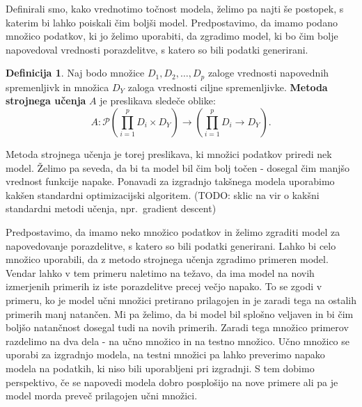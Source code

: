 \documentclass[12pt,a4paper,twoside]{article}
\theoremstyle{definition} %
\newtheorem{definicija}{Definicija}[section]
\theoremstyle{plain} %
\numberwithin{equation}{section}  %
\begin{document}
Definirali smo, kako vrednotimo točnost modela, želimo pa najti še postopek, s katerim bi lahko poiskali čim boljši model. Predpostavimo, da imamo podano množico podatkov, ki jo želimo uporabiti, da zgradimo model, ki bo čim bolje napovedoval vrednosti porazdelitve, s katero so bili podatki generirani.

\begin{definicija}
Naj bodo množice $D_1, D_2, \ldots, D_p$ zaloge vrednosti napovednih spremenljivk in množica $D_Y$ zaloga vrednosti ciljne spremenljivke. 
\textbf{Metoda strojnega učenja} $A$ je preslikava sledeče oblike:
\[
A: \mathcal{P}(\prod_{i=1}^p D_i \times D_Y) \rightarrow (\prod_{i=1}^p D_i \rightarrow D_Y).
\]
\end{definicija}

Metoda strojnega učenja je torej preslikava, ki množici podatkov priredi nek model. Želimo pa seveda, da bi ta model bil čim bolj točen - dosegal čim manjšo vrednost funkcije napake. Ponavadi za izgradnjo takšnega modela uporabimo kakšen standardni optimizacijski algoritem. (TODO: sklic na vir o kakšni standardni metodi učenja, npr.\ gradient descent)

Predpostavimo, da imamo neko množico podatkov in želimo zgraditi model za napovedovanje porazdelitve, s katero so bili podatki generirani. 
Lahko bi celo množico uporabili, da z metodo strojnega učenja zgradimo primeren model. 
Vendar lahko v tem primeru naletimo na težavo, da ima model na novih izmerjenih primerih iz iste porazdelitve precej večjo napako. 
To se zgodi v primeru, ko je model učni množici pretirano prilagojen in je zaradi tega na ostalih primerih manj natančen. 
Mi pa želimo, da bi model bil splošno veljaven in bi čim boljšo natančnost dosegal tudi na novih primerih. 
Zaradi tega množico primerov razdelimo na dva dela - na učno množico in na testno množico. 
Učno množico se uporabi za izgradnjo modela, na testni množici pa lahko preverimo napako modela na podatkih, ki niso bili uporabljeni pri izgradnji. 
S tem dobimo perspektivo, če se napovedi modela dobro posplošijo na nove primere ali pa je model morda preveč prilagojen učni množici.

\end{document}
